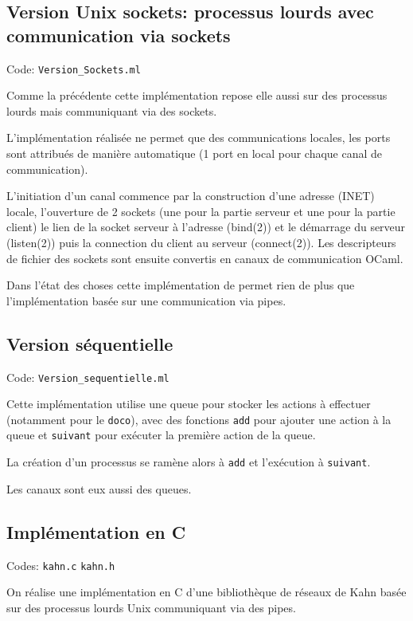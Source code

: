 \documentclass[a4paper]{article}
\begin{document}
\subsection{Version Unix sockets: processus lourds avec communication via sockets}

Code: \verb|Version_Sockets.ml|

Comme la précédente cette implémentation repose elle aussi sur des processus lourds mais communiquant via des sockets.

L'implémentation réalisée ne permet que des communications locales, les ports sont attribués de manière automatique (1 port en local pour chaque canal de communication).

L'initiation d'un canal commence par la construction d'une adresse (INET) locale, l'ouverture de 2 sockets (une pour la partie serveur et une pour la partie client) le lien de la socket serveur à l'adresse (bind(2)) et le démarrage du serveur (listen(2)) puis la connection du client au serveur (connect(2)). Les descripteurs de fichier des sockets sont ensuite convertis en canaux de communication OCaml.

Dans l'état des choses cette implémentation de permet rien de plus que l'implémentation basée sur une communication via pipes.

\subsection{Version séquentielle}

Code: \verb|Version_sequentielle.ml|

Cette implémentation utilise une queue pour stocker les actions à effectuer (notamment pour le \texttt{doco}), avec des fonctions \texttt{add} pour ajouter une action à la queue et \texttt{suivant} pour exécuter la première action de la queue.

La création d'un processus se ramène alors à \texttt{add} et l'exécution à \texttt{suivant}.

Les canaux sont eux aussi des queues. 


\subsection{Implémentation en C}

Codes: \verb|kahn.c| \verb|kahn.h|

On réalise une implémentation en C d'une bibliothèque de réseaux de Kahn basée sur des processus lourds Unix communiquant via des pipes.
\end{document}
